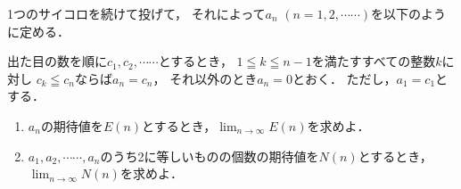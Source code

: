\documentclass[../../main.tex]{subfiles}
\begin{document}
1つのサイコロを続けて投げて，
それによって$a_n$ $(n=1,2,\cdots\cdots)$を以下のように定める．

出た目の数を順に$c_1,c_2,\cdots\cdots$とするとき，
$1 \leqq k \leqq n-1$を満たすすべての整数$k$に対し
$c_k \leqq c_n$ならば$a_n=c_n$，
それ以外のとき$a_n=0$とおく．
ただし，$a_1=c_1$とする．
\begin{enumerate}
  \item $a_n$の期待値を$E(n)$とするとき，$\displaystyle\lim_{n\to\infty}E(n)$を求めよ．
  \item $a_1,a_2,\cdots\cdots,a_n$のうち2に等しいものの個数の期待値を$N(n)$とするとき，
    $\displaystyle\lim_{n\to\infty}N(n)$を求めよ．
\end{enumerate}
\end{document}
